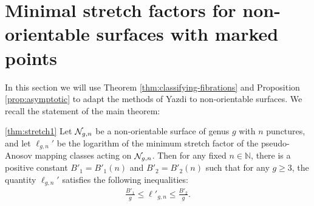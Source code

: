 \section{Minimal stretch factors for non-orientable surfaces with marked points}
\label{sec:application}

In this section we will use Theorem \ref{thm:classifying-fibrations} and Proposition  \ref{prop:asymptotic} to adapt the methods of Yazdi \cite{yazdi2018pseudo} to non-orientable surfaces. We recall the statement of the main theorem:
\begin{manualtheorem}
  {\ref{thm:stretch1}}
Let $\mathcal{N}_{g,n}$ be a non-orientable surface of genus $g$ with $n$ punctures, and let $\ell_{g,n}'$ be the logarithm of
  the minimum stretch factor of the pseudo-Anosov mapping classes acting on $\mathcal{N}_{g,n}$.
  Then for any fixed $n \in \mathbb{N}$, there is a positive constant $B'_1 = B'_1(n)$ and $B'_2 = B'_2(n)$ such
  that for any $g \geq 3$,
  the quantity $\ell_{g,n}'$ satisfies the following inequalities:
  \begin{align*}
    \frac{B'_1}{g} \leq \ell'_{g,n} \leq \frac{B'_2}{g}.
  \end{align*}
\end{manualtheorem}




